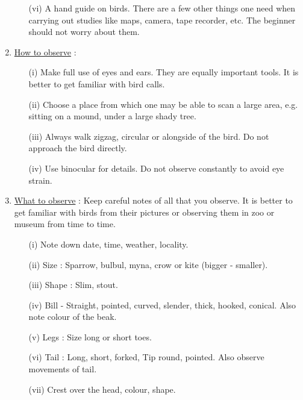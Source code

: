 \begin{enumerate}
\begin{itemize}
\item[(vi)] A hand guide on birds. There are a few other things one 
need when carrying out studies like maps, camera, tape 
recorder, etc. The beginner should not worry about 
them. 
\end{itemize}

\item \underline{How to observe} :
\begin{itemize}
\item[(i)] Make full use of eyes and ears. They are equally important 
tools. It is better to get familiar with bird calls. 

\item[(ii)] Choose a place from which one may be able to scan a 
large area, e.g. sitting on a mound, under a large 
shady tree. 

\item[(iii)] Always walk zigzag, circular or alongside of the bird. Do 
not approach the bird directly. 

\item[(iv)] Use binocular for details. Do not observe constantly to 
avoid eye strain. 
\end{itemize}

\item \underline{What to observe} : Keep careful notes of all that you observe. 
It is better to get familiar with birds from their 
pictures or observing them in zoo or museum from time to 
time. 
\begin{itemize}
\item[(i)] Note down date, time, weather, locality. 

\item[(ii)] Size  : Sparrow, bulbul, myna, crow or kite 
(bigger - smaller). 

\item[(iii)] Shape : Slim, stout. 

\item[(iv)] Bill - Straight, pointed, curved, slender, thick, 
hooked, conical. Also note colour of the beak.

\item[(v)] Legs : Size long or short toes. 

\item[(vi)] Tail : Long, short, forked, Tip round, pointed. Also 
observe movements of tail. 

\item[(vii)] Crest over the head, colour, shape. 


\end{itemize}
\end{enumerate}

